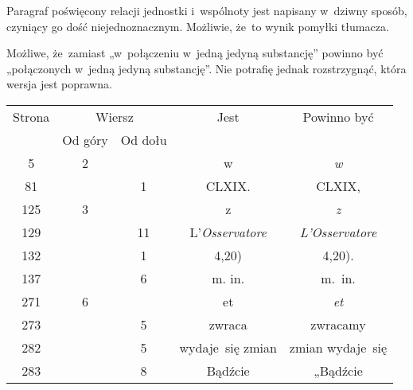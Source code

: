 \documentclass[a4paper,11pt]{article}
\numberwithin{equation}{section}
\begin{document}
\VerSpaceFour





\noindent
{} Paragraf poświęcony relacji jednostki i~wspólnoty jest napisany
w~dziwny sposób, czyniący go dość niejednoznacznym. Możliwie, że~to wynik
pomyłki tłumacza.

\VerSpaceFour





\noindent
{} Możliwe, że~zamiast „w~połączeniu w~jedną jedyną substancję”
powinno być „połączonych w~jedną jedyną substancję”. Nie potrafię jednak
rozstrzygnąć, która wersja jest poprawna.






\newpage



\begin{center}

  \begin{tabular}{|c|c|c|c|c|}
    \hline
    Strona & \multicolumn{2}{c|}{Wiersz} & Jest
                              & Powinno być \\ \cline{2-3}
    & Od góry & Od dołu & & \\
    \hline
    \hphantom{00}5 & \hphantom{0}2 & & w & \textit{w} \\
    \hphantom{0}81 & & \hphantom{0}1 & CLXIX. & CLXIX, \\
    125 & \hphantom{0}3 & & z & \textit{z} \\
    129 & & 11 & L'\textit{Osservatore} & \textit{L'Osservatore} \\
    132 & & \hphantom{0}1 & 4,20) & 4,20). \\
    137 & & \hphantom{0}6 & m.\hspace{1em} in. & m.~in.\\
    271 & \hphantom{0}6 & & et & \textit{et} \\
    273 & & \hphantom{0}5 & zwraca & zwracamy \\
    282 & & \hphantom{0}5 & wydaje~się zmian & zmian wydaje~się \\
    283 & & \hphantom{0}8 & Bądźcie & „Bądźcie \\
    \hline
  \end{tabular}

\end{center}
\end{document}

